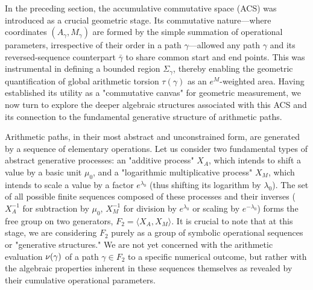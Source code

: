 In the preceding section, the accumulative commutative space (ACS) was introduced as a crucial geometric stage. Its commutative nature—where coordinates $(A_\gamma, M_\gamma)$ are formed by the simple summation of operational parameters, irrespective of their order in a path $\gamma$—allowed any path $\gamma$ and its reversed-sequence counterpart $\bar{\gamma}$ to share common start and end points. This was instrumental in defining a bounded region $\Sigma_\gamma$, thereby enabling the geometric quantification of global arithmetic torsion $\tau(\gamma)$ as an $e^M$-weighted area. Having established its utility as a "commutative canvas" for geometric measurement, we now turn to explore the deeper algebraic structures associated with this ACS and its connection to the fundamental generative structure of arithmetic paths.

Arithmetic paths, in their most abstract and unconstrained form, are generated by a sequence of elementary operations. Let us consider two fundamental types of abstract generative processes: an "additive process" $X_A$, which intends to shift a value by a basic unit $\mu_0$, and a "logarithmic multiplicative process" $X_M$, which intends to scale a value by a factor $e^{\lambda_0}$ (thus shifting its logarithm by $\lambda_0$). The set of all possible finite sequences composed of these processes and their inverses ($X_A^{-1}$ for subtraction by $\mu_0$, $X_M^{-1}$ for division by $e^{\lambda_0}$ or scaling by $e^{-\lambda_0}$) forms the free group on two generators, $F_2 = \langle X_A, X_M \rangle$. It is crucial to note that at this stage, we are considering $F_2$ purely as a group of symbolic operational sequences or "generative structures." We are not yet concerned with the arithmetic evaluation $\nu(\gamma)$ of a path $\gamma \in F_2$ to a specific numerical outcome, but rather with the algebraic properties inherent in these sequences themselves as revealed by their cumulative operational parameters.

